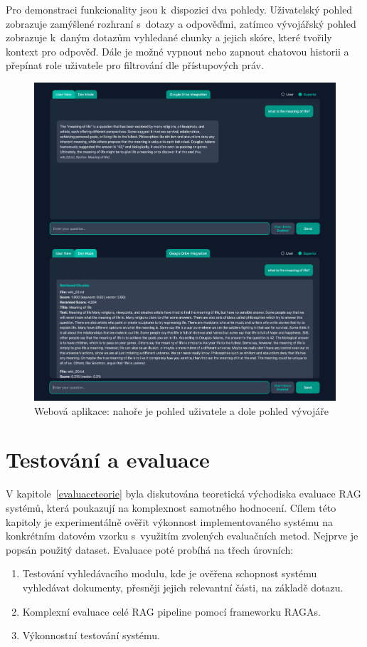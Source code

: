Pro demonstraci funkcionality jsou k~dispozici dva pohledy. Uživatelský pohled zobrazuje zamýšlené rozhraní s~dotazy a odpověďmi, zatímco vývojářský pohled zobrazuje k~daným dotazům vyhledané chunky a jejich skóre, které tvořily kontext pro odpověď. Dále je možné vypnout nebo zapnout chatovou historii a přepínat role uživatele pro filtrování dle přístupových práv. 

\begin{figure}[H]
    \centering
    \includegraphics[width=0.97\linewidth]{obrazky/ui.png}
    \caption{Webová aplikace: nahoře je pohled uživatele a dole pohled vývojáře}
    \label{fig:gui}
\end{figure}



\chapter{Testování a evaluace}
\label{evaluace}
V kapitole~\ref{evaluaceteorie} byla diskutována teoretická východiska evaluace RAG systémů, která poukazují na komplexnost samotného hodnocení. Cílem této kapitoly je experimentálně ověřit výkonnost implementovaného systému na konkrétním datovém vzorku s~využitím zvolených evaluačních metod. Nejprve je popsán použitý dataset. Evaluace poté probíhá na třech úrovních: 
\begin{enumerate}
    \item Testování vyhledávacího modulu, kde je ověřena schopnost systému vyhledávat dokumenty, přesněji jejich relevantní části, na základě dotazu.
    \item Komplexní evaluace celé RAG pipeline pomocí frameworku RAGAs.
    \item Výkonnostní testování systému.
\end{enumerate}

